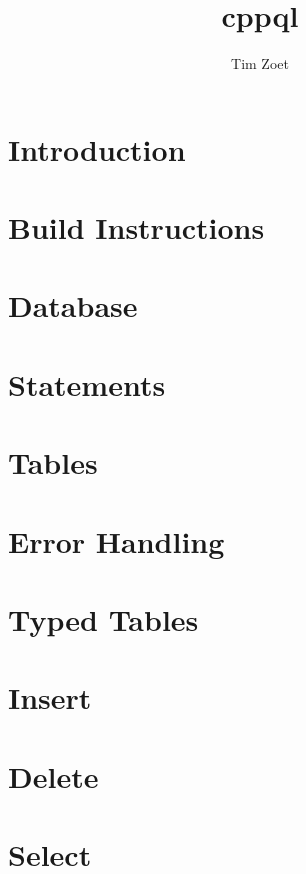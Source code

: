 \documentclass[twoside,a4paper,smallborder=true]{refart}
\title{cppql}
\author{Tim Zoet}
\date{}
\begin{document}
\maketitle

\tableofcontents
\newpage


\section{Introduction}
\label{section:introduction}

\newpage

\section{Build Instructions}
\label{section:build}

\newpage

\section{Database}
\label{section:database}

\newpage

\section{Statements}
\label{section:statements}

\newpage

\section{Tables}
\label{section:tables}

\newpage

\section{Error Handling}
\label{section:errors}

\newpage

\section{Typed Tables}
\label{section:typed_tables}

\newpage

\section{Insert}
\label{section:insert}

\newpage

\section{Delete}
\label{section:delete}

\newpage

\section{Select}
\label{section:select}

\newpage

\printglossaries
\newpage

 
 
\printindex
\end{document}
